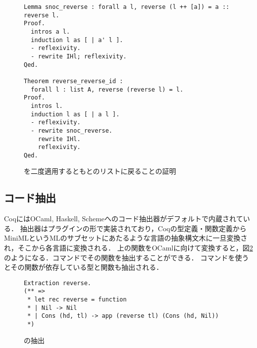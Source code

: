 \begin{figure}
\begin{lstlisting}
Lemma snoc_reverse : forall a l, reverse (l ++ [a]) = a :: reverse l.
Proof.
  intros a l.
  induction l as [ | a' l ].
  - reflexivity.
  - rewrite IHl; reflexivity.
Qed.

Theorem reverse_reverse_id :
  forall l : list A, reverse (reverse l) = l.
Proof.
  intros l.
  induction l as [ | a l ].
  - reflexivity.
  - rewrite snoc_reverse.
    rewrite IHl.
    reflexivity.
Qed.
\end{lstlisting}
\caption{を二度適用するともとのリストに戻ることの証明}\label{code:background:reverse-reverse}
\end{figure}


\subsection{コード抽出}

CoqにはOCaml, Haskell, Schemeへのコード抽出器がデフォルトで内蔵されている．
抽出器はプラグインの形で実装されており，Coqの型定義・関数定義からMiniMLというMLのサブセットにあたるような言語の抽象構文木に一旦変換され，そこから各言語に変換される\cite{letouzey2008extraction}．
上の関数をOCamlに向けて変換すると，図\ref{code:background:reverse-erl}のようになる．コマンドでその関数を抽出することができる．
コマンドを使うとその関数が依存している型と関数も抽出される．

\begin{figure}
\begin{lstlisting}
Extraction reverse.
(** =>
 * let rec reverse = function
 * | Nil -> Nil
 * | Cons (hd, tl) -> app (reverse tl) (Cons (hd, Nil))
 *)
\end{lstlisting}
\caption{の抽出}\label{code:background:reverse-erl}
\end{figure}



